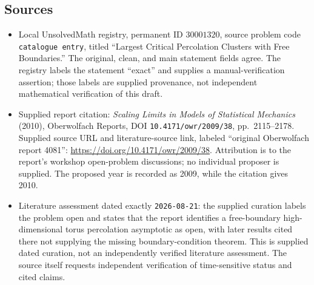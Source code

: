 \documentclass[11pt]{article}
\begin{document}
\subsection{Sources}
\begin{itemize}
\item Local UnsolvedMath registry, permanent ID \(30001320\), source problem code \texttt{catalogue entry}, titled ``Largest Critical Percolation Clusters with Free Boundaries.'' The original, clean, and main statement fields agree. The registry labels the statement ``exact'' and supplies a manual-verification assertion; those labels are supplied provenance, not independent mathematical verification of this draft.
\item Supplied report citation: \emph{Scaling Limits in Models of Statistical Mechanics} (2010), Oberwolfach Reports, DOI \texttt{10.4171/owr/2009/38}, pp.\ 2115--2178. Supplied source URL and literature-source link, labeled ``original Oberwolfach report 4081'': \url{https://doi.org/10.4171/owr/2009/38}. Attribution is to the report's workshop open-problem discussions; no individual proposer is supplied. The proposed year is recorded as 2009, while the citation gives 2010.
\item Literature assessment dated exactly \texttt{2026-08-21}: the supplied curation labels the problem open and states that the report identifies a free-boundary high-dimensional torus percolation asymptotic as open, with later results cited there not supplying the missing boundary-condition theorem. This is supplied dated curation, not an independently verified literature assessment. The source itself requests independent verification of time-sensitive status and cited claims.
\end{itemize}
\end{document}
